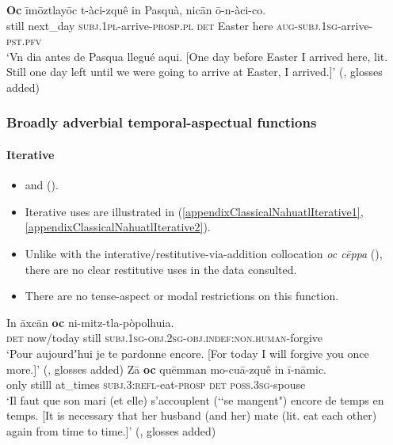 \begin{exe}
	\ex\label{exAppendixClassicalNahuatlTimeSpan5}
	\gll \textbf{Oc} īmōztlayōc t-àci-zquê in Pasquà, nicān ō-n-àci-co.\\
	still next\_day \textsc{subj}.1\textsc{pl}-arrive-\textsc{prosp}.\textsc{pl} \textsc{det} Easter here \textsc{aug}-\textsc{subj}.1\textsc{sg}-arrive-\textsc{pst}.\textsc{pfv}\\
	\glt \lq Vn dia antes de Pasqua llegué aqui. [One day before Easter I arrived here, lit. Still one day left until we were going to arrive at Easter, I arrived.]' (\cite[501]{Carochi1645}, glosses added)
\end{exe}

\subsubsection{Broadly adverbial temporal-aspectual functions}
\paragraph{Iterative}
\label{appendixClassicalNahuatlIterative}
\begin{itemize}
	\item  \textcite[246]{Bierhorst1985} and \parencite[1265]{Launey1986} (\citeyear[1265]{Launey1986}).
	\item Iterative uses are illustrated in (\ref{appendixClassicalNahuatlIterative1}, \ref{appendixClassicalNahuatlIterative2}).
	\item Unlike with the interative/restitutive-via-addition collocation \textit{oc cēppa} (), there are no clear restitutive uses in the data consulted.
	\item There are no tense-aspect or modal restrictions on this function.
\end{itemize}
\begin{exe}
	\ex\label{appendixClassicalNahuatlIterative1}
	\gll In āxcān \textbf{oc} ni-mitz-tla-pòpolhuia.\\
	\textsc{det} now/today still \textsc{subj}.1\textsc{sg}-\textsc{obj}.2\textsc{sg}-\textsc{obj}.\textsc{indef}:\textsc{non}.\textsc{human}-forgive\\
	\glt \lq Pour aujourdʼhui je te pardonne encore. [For today I will forgive you once more.]' (\cite[1265]{Launey1986}, glosses added)
	\ex\label{appendixClassicalNahuatlIterative2}
	\gll Zā \textbf{oc} quēmman mo-cuā-zquê in ī-nāmic.\\
	only stilll at\_times \textsc{subj}.3:\textsc{refl}-eat-\textsc{prosp} \textsc{det} \textsc{poss}.3\textsc{sg}-spouse\\
	\glt \lq Il faut que son mari (et elle) s'accouplent (\lq\lq se mangent") encore de temps en temps. [It is necessary that her husband (and her) mate (lit. eat each other) again from time to time.]' (\cite[1265]{Launey1986}, glosses added)
\end{exe}

